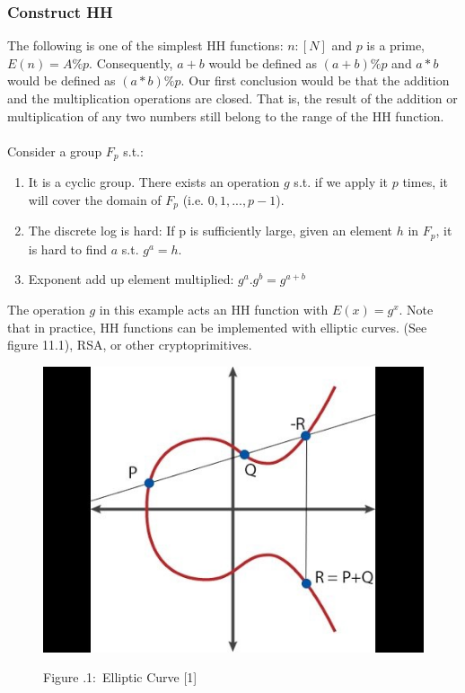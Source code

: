 \documentclass[twoside]{article}
\newcounter{lecnum}
\renewcommand{\cite}[1]{[#1]}
\newcommand{\fig}[3]{
			\vspace{#2}
			\begin{center}
			Figure \thelecnum.#1:~#3
			\end{center}
	}
\begin{document}
\subsubsection{Construct HH}
The following is one of the simplest HH functions: 
$n: [N]$ and $p$ is a prime, $E(n) = A \% p$. Consequently, $a+b$ would be defined as $(a+b) \% p$ and $a*b$ would be defined as $(a*b) \% p$. Our first conclusion would be that the addition and the multiplication operations are closed. That is, the result of the addition or multiplication of any two numbers still belong to the range of the HH function.\\ \\
Consider a group $F_p$ s.t.:
\begin{enumerate}[topsep=0pt,itemsep=-1ex,partopsep=1ex,parsep=1ex]
    \item It is a cyclic group. There exists an operation $g$ s.t. if we apply it $p$ times, it will cover the domain of $F_p$ (i.e. $0, 1, ..., p-1$).
    \item The discrete log is hard: If p is sufficiently large, given an element $h$ in $F_p$, it is hard to find $a$ s.t. $g^a = h$.
    \item Exponent add up element multiplied: $g^a.g^b = g^{a+b}$ \\
\end{enumerate}
The operation $g$ in this example acts an HH function with $E(x)=g^x$.
Note that in practice, HH functions can be implemented with elliptic curves. (See figure 11.1), RSA, or other cryptoprimitives. \\
\begin{figure}
    \centering
    \includegraphics[scale=0.25]{elliptic1.jpg}
    \fig{1}{0.1in}{Elliptic Curve \cite{1}}
\end{figure}
\end{document}
